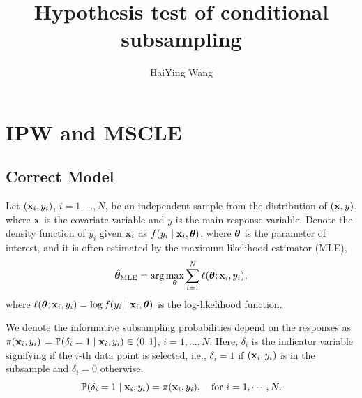 \documentclass[12pt,hidelinks]{article}
\begin{document}
\title{Hypothesis test of conditional subsampling}
\author{HaiYing Wang}
\maketitle

\section{IPW and MSCLE}

\subsection{Correct Model}

Let $(\mathbf{x}_i, y_i)$, $i=1,\ldots,N$, be an independent sample from the distribution of $(\mathbf{x}, y)$, where $\mathbf{x}$ is the covariate variable and $y$ is the main response variable. Denote the density function of $y_i$ given $\mathbf{x}_i$ as $f(y_i \mid \mathbf{x}_i, \bm{\theta})$, where $\bm{\theta}$ is the parameter of interest, and it is often estimated by the maximum likelihood estimator (MLE),
\begin{align}
    {\hat{\bm{\theta}}}_{\text{MLE}} = \arg\max_{\bm{\theta}} \sum_{i=1}^{N} \ell(\bm{\theta}; \mathbf{x}_i, y_i),
\end{align}
where $\ell(\bm{\theta}; \mathbf{x}_i, y_i) = \log f(y_i \mid \mathbf{x}_i, \bm{\theta})$ is the log-likelihood function.

We denote the informative subsampling probabilities depend on the responses as $\pi(\mathbf{x}_i, y_i)$ $ = \mathbb{P}(\delta_i = 1 \mid \mathbf{x}_i, y_i) \in (0,1]$, $i=1,\ldots,N$. Here, $\delta_i$ is the indicator variable signifying if the $i$-th data point is selected, i.e., $\delta_i = 1$ if $(\mathbf{x}_i, y_i)$ is in the subsample and $\delta_i = 0$ otherwise.
\begin{equation*}
    \mathbb{P}(\delta_i = 1 \mid \mathbf{x}_i, y_i) = \pi(\mathbf{x}_i, y_i), \quad \text{for } i = 1,\cdots,N.
\end{equation*} 
\end{document}
